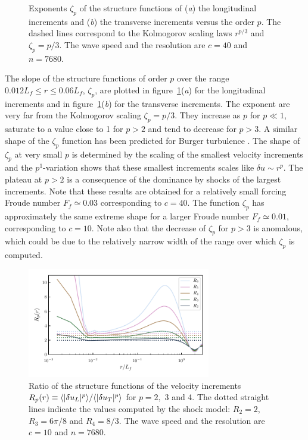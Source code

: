 \begin{figure}
\caption{
Exponents $\zeta_p$ of the structure functions 
of (\textit{a}) the longitudinal increments 
and (\textit{b}) the transverse increments versus the order $p$.
%
The dashed lines correspond to 
the Kolmogorov scaling laws $r^{p/3}$ and $\zeta_p = p/3$.
The wave speed and the resolution are $c = 40$ and $n = 7680$.
}
\label{fig_interm}
\end{figure}






The slope of the structure functions of order $p$ over the range
$0.012 L_f\leqslant r \leqslant 0.06 L_f$, $\zeta_p$, are plotted in
figure~\ref{fig_interm}(\textit{a}) for the longitudinal increments
and in figure~\ref{fig_interm}(\textit{b}) for the transverse
increments.
%
The exponent are very far from the Kolmogorov scaling $\zeta_p = p/3$.
They increase as $p$ for $p\ll1$, saturate to a value close to 1 for
$p>2$ and tend to decrease for $p>3$.
%
A similar shape of the $\zeta_p$ function has been predicted for
Burger turbulence \cite[]{BouchaudMezardParisi1995}.
%
The shape of $\zeta_p$ at very small $p$ is determined by the
scaling of the smallest velocity increments and the $p^1$-variation
shows that these smallest increments scales like $\delta u \sim r^p$.
%
The plateau at $p > 2$ is a consequence of the dominance by shocks of
the largest increments.
%
Note that these results are obtained for a relatively small forcing
Froude number $F_f \simeq 0.03$ corresponding to $c=40$.  The function
$\zeta_p$ has approximately the same extreme shape for a larger Froude
number $F_f \simeq 0.01$, corresponding to $c=10$.  Note also that the
decrease of $\zeta_p$ for $p>3$ is anomalous, which could be due to
the relatively narrow width of the range over which $\zeta_p$ is
computed.



\begin{figure}
\centerline{\includegraphics[width=8cm]{../Pyfig/fig_ratio_strfct}}
\caption{
Ratio of the structure functions of the velocity increments 
$R_p(r) \equiv \langle |\delta u_L|^p \rangle / \langle |\delta u_T|^p \rangle$
for $p = 2,$ 3 and 4.
The dotted straight lines indicate the values computed by the shock model:
$R_2 = 2$, $R_3 = 6\pi/8$ and $R_4 = 8/3$.
%
The wave speed and the resolution are $c = 10$ and $n = 7680$.  }
\label{fig_ratio}
\end{figure}


